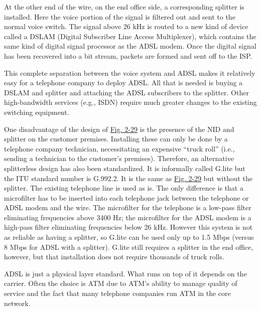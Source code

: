 
At the other end of the wire, on the end office side, a corresponding
splitter is installed. Here the voice portion of the signal is filtered
out and sent to the normal voice switch. The signal above 26 kHz is
routed to a new kind of device called a {DSLAM} ({Digital Subscriber
Line Access Multiplexer}), which contains the same kind of digital
signal processor as the ADSL modem. Once the digital signal has been
recovered into a bit stream, packets are formed and sent off to the ISP.

This complete separation between the voice system and ADSL makes it
relatively easy for a telephone company to deploy ADSL. All that is
needed is buying a DSLAM and splitter and attaching the ADSL subscribers
to the splitter. Other high-bandwidth services (e.g., ISDN) require much
greater changes to the existing switching equipment.

One disadvantage of the design of
\protect\hyperlink{0130661023_ch02lev1sec5.htmlux5cux23ch02fig29}{Fig.
2-29} is the presence of the NID and splitter on the customer premises.
Installing these can only be done by a telephone company technician,
necessitating an expensive ``truck roll'' (i.e., sending a technician to
the customer's premises). Therefore, an alternative splitterless design
has also been standardized. It is informally called G.lite but the ITU
standard number is G.992.2. It is the same as
\protect\hyperlink{0130661023_ch02lev1sec5.htmlux5cux23ch02fig29}{Fig.
2-29} but without the splitter. The existing telephone line is used as
is. The only difference is that a microfilter has to be inserted into
each telephone jack between the telephone or ADSL modem and the wire.
The microfilter for the telephone is a low-pass filter eliminating
frequencies above 3400 Hz; the microfilter for the ADSL modem is a
high-pass filter eliminating frequencies below 26 kHz. However this
system is not as reliable as having a splitter, so G.lite can be used
only up to 1.5 Mbps (versus 8 Mbps for ADSL with a splitter). G.lite
still requires a splitter in the end office, however, but that
installation does not require thousands of truck rolls.

ADSL is just a physical layer standard. What runs on top of it depends
on the carrier. Often the choice is ATM due to ATM's ability to manage
quality of service and the fact that many telephone companies run ATM in
the core network.

\protect\hypertarget{0130661023_ch02lev1sec5.htmlux5cux23ch02lev3sec11}{}{}

